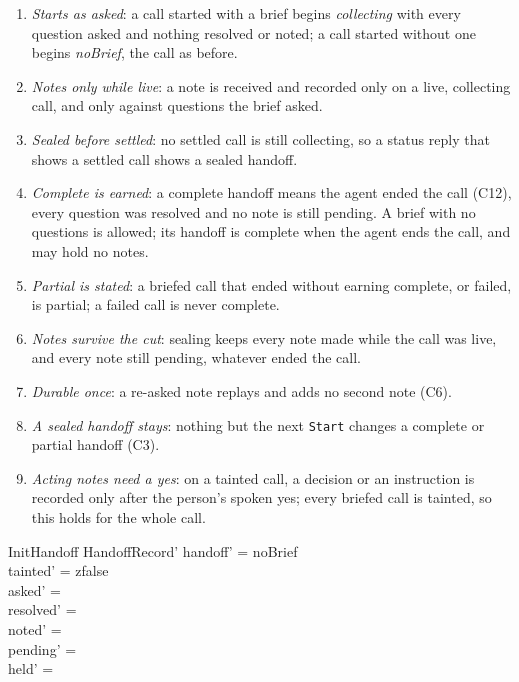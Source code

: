 \documentclass[a4paper,10pt,fleqn]{article}
\begin{document}
\begin{enumerate}
  \item[H1] \emph{Starts as asked}: a call started with a brief begins
    \emph{collecting} with every question asked and nothing resolved or
    noted; a call started without one begins \emph{noBrief}, the call as
    before.
  \item[H2] \emph{Notes only while live}: a note is received and recorded
    only on a live, collecting call, and only against questions the brief
    asked.
  \item[H3] \emph{Sealed before settled}: no settled call is still
    collecting, so a status reply that shows a settled call shows a sealed
    handoff.
  \item[H4] \emph{Complete is earned}: a complete handoff means the agent
    ended the call (C12), every question was resolved and no note is still
    pending. A brief with no questions is allowed; its handoff is complete
    when the agent ends the call, and may hold no notes.
  \item[H5] \emph{Partial is stated}: a briefed call that ended without
    earning complete, or failed, is partial; a failed call is never
    complete.
  \item[H6] \emph{Notes survive the cut}: sealing keeps every note made
    while the call was live, and every note still pending, whatever ended
    the call.
  \item[H7] \emph{Durable once}: a re-asked note replays and adds no second
    note (C6).
  \item[H8] \emph{A sealed handoff stays}: nothing but the next
    \texttt{Start} changes a complete or partial handoff (C3).
  \item[H9] \emph{Acting notes need a yes}: on a tainted call, a decision or
    an instruction is recorded only after the person's spoken yes; every
    briefed call is tainted, so this holds for the whole call.
\end{enumerate}

\begin{schema}{InitHandoff}
  HandoffRecord'
\where
  handoff' = noBrief \\
  tainted' = zfalse \\
  asked' = \emptyset \\
  resolved' = \emptyset \\
  noted' = \emptyset \\
  pending' = \emptyset \\
  held' = \emptyset
\end{schema}
\end{document}
